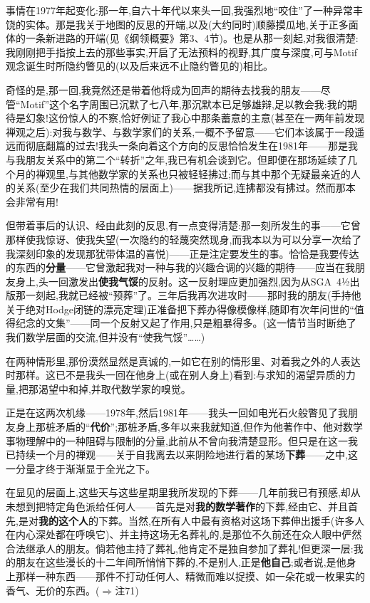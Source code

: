 事情在1977年起变化:那一年,自六十年代以来头一回,我强烈地“咬住”了一种异常丰饶的实体。那是我关于地图的反思的开端,以及(大约同时)顺藤摸瓜地,关于正多面体的一条新进路的开端(见《纲领概要》第3、4节)。也是从那一刻起,对我很清楚:我刚刚把手指按上去的那些事实,开启了无法预料的视野,其广度与深度,可与Motif观念诞生时所隐约瞥见的(以及后来远不止隐约瞥见的)相比。

奇怪的是,那一回,我竟然还是带着他将成为回声的期待去找我的朋友——尽管“Motif”这个名字周围已沉默了七八年,那沉默本已足够雄辩,足以教会我:我的期待是幻象!这份惊人的不察,恰好例证了我心中那条蓄意的主意(甚至在一两年前发现禅观之后):对我与数学、与数学家们的关系,一概不予留意——它们本该属于一段遥远而彻底翻篇的过去!我头一条向着这个\dmark{}方向的反思恰恰发生在1981年——那是我与我朋友关系中的第二个“转折”之年,我已有机会谈到它。但即便在那场延续了几个月的禅观里,与其他数学家的关系也只被轻轻拂过;而与其中那个无疑最亲近的人的关系(至少在我们共同热情的层面上)——据我所记,连拂都没有拂过。然而那本会非常有用!

但带着事后的认识、经由此刻的反思,有一点变得清楚:那一刻所发生的事——它曾那样使我惊讶、使我失望(一次隐约的轻蔑突然现身,而我本以为可以分享一次给了我深刻印象的发现那犹带体温的喜悦)——正是注定要发生的事。恰恰是我要传达的东西的\textbf{分量}——它曾激起我对一种与我的兴趣合调的兴趣的期待——应当在我朋友身上,头一回激发出\textbf{使我气馁}的反射。这一反射理应更加强烈,因为从SGA~4½出版那一刻起,我就已经被“预葬”了。三年后我再次进攻时——那时我的朋友(手持他关于绝对Hodge闭链的漂亮定理)正准备把下葬办得像模像样,随即有次年问世的“值得纪念的文集”——同一个反射又起了作用,只是粗暴得多。(这一情节当时断绝了我们数学层面的交流,但并没有“使我气馁”……)

在两种情形里,那份漠然显然是真诚的,一如它在别的情形里、对着我之外的人表达时那样。这已不是我头一回在他身上(或在别人身上)看到:与求知的渴望异质的力量,把那渴望中和掉,并取代数学家的嗅觉。

正是在这两次机缘——1978年,然后1981年——我头一回如电光石火般瞥见了我朋友身上那桩矛盾的“\textbf{代价}”;那桩矛盾,多年以来我就知道,但作为他著作中、他对数学事物理解中的一种阻碍与限制的分量,此前从不曾向我清楚显形。但只是在这一我已持续一个月的禅观——关于自我离去以来阴险地进行着的某场\textbf{下葬}——之中,这一\dmark{}分量才终于渐渐显于全光之下。

在显见的层面上,这些天与这些星期里我所发现的下葬——几年前我已有预感,却从未想到把特定角色派给任何人——首先是对\textbf{我的数学著作}的下葬,经由它、并且首先,是对\textbf{我的这个人}的下葬。当然,在所有人中最有资格对这场下葬伸出援手(许多人在内心深处都在呼唤它)、并主持这场无名葬礼的,是那位不久前还在众人眼中俨然合法继承人的朋友。倘若他主持了葬礼,他肯定不是独自参加了葬礼!但更深一层:我的朋友在这些漫长的十二年间所悄悄下葬的,不是别人,正是\textbf{他自己};或者说,是他身上那样一种东西——那件不打动任何人、精微而难以捉摸、如一朵花或一枚果实的香气、无价的东西。($\Rightarrow$注71)

